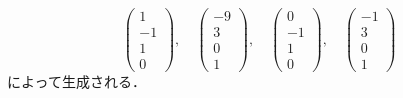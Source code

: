 \documentclass[a4paper,10pt,fleqn]{ltjsarticle}
\begin{document}
\begin{tleftbar}
\[    \begin{pmatrix} 1 \\ -1 \\ 1 \\ 0 \end{pmatrix} ,\quad  \begin{pmatrix} -9 \\ 3 \\ 0 \\ 1 \end{pmatrix},\quad \begin{pmatrix} 0 \\ -1 \\ 1 \\ 0 \end{pmatrix} ,\quad  \begin{pmatrix} -1 \\ 3 \\ 0 \\ 1 \end{pmatrix}
  \]
  によって生成される．


\end{tleftbar}
\end{document}

